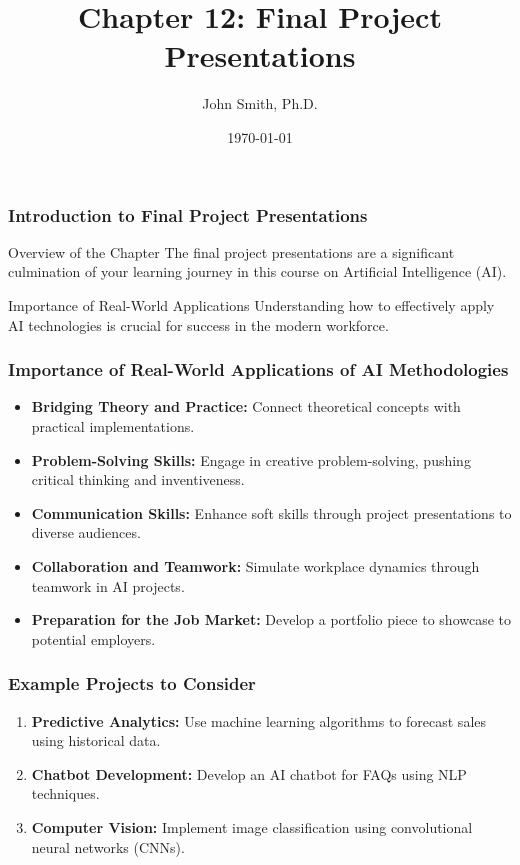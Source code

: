 \documentclass[aspectratio=169]{beamer}
\title[Final Project Presentations]{Chapter 12: Final Project Presentations}
\author[J. Smith]{John Smith, Ph.D.}
\institute[University Name]{
  Department of Computer Science\\
  University Name\\
  Email: email@university.edu\\
  Website: www.university.edu
}
\date{\today}
\begin{document}
\frame{\titlepage}

\begin{frame}[fragile]
    \frametitle{Introduction to Final Project Presentations}
    \begin{block}{Overview of the Chapter}
        The final project presentations are a significant culmination of your learning journey in this course on Artificial Intelligence (AI). 
    \end{block}
    \begin{block}{Importance of Real-World Applications}
        Understanding how to effectively apply AI technologies is crucial for success in the modern workforce.
    \end{block}
\end{frame}

\begin{frame}[fragile]
    \frametitle{Importance of Real-World Applications of AI Methodologies}
    \begin{itemize}
        \item \textbf{Bridging Theory and Practice:} Connect theoretical concepts with practical implementations.
        \item \textbf{Problem-Solving Skills:} Engage in creative problem-solving, pushing critical thinking and inventiveness.
        \item \textbf{Communication Skills:} Enhance soft skills through project presentations to diverse audiences.
        \item \textbf{Collaboration and Teamwork:} Simulate workplace dynamics through teamwork in AI projects.
        \item \textbf{Preparation for the Job Market:} Develop a portfolio piece to showcase to potential employers.
    \end{itemize}
\end{frame}

\begin{frame}[fragile]
    \frametitle{Example Projects to Consider}
    \begin{enumerate}
        \item \textbf{Predictive Analytics:} Use machine learning algorithms to forecast sales using historical data.
        \item \textbf{Chatbot Development:} Develop an AI chatbot for FAQs using NLP techniques.
        \item \textbf{Computer Vision:} Implement image classification using convolutional neural networks (CNNs).
    \end{enumerate}
\end{frame}
\end{document}
